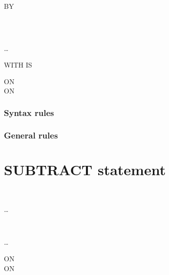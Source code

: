\begin{syntax}
  \begin{1=}
    \begin{1=}
      \identifier \\
      \literal
    \end{1=}

    \begin{0-1}
       BY
      \begin{1=}
         \\
        \identifier \\
        \literal
      \end{1=}
    \end{0-1}
  \end{1=} \ldots\ {}
   \identifier

  \begin{0-1}
    WITH  IS \identifier
  \end{0-1}

  \begin{0+}
    ON  \imperativestatement \\
     ON  \imperativestatement
  \end{0+}
\end{syntax}

\subsubsection{Syntax rules}

\subsubsection{General rules}

\section{SUBTRACT statement}

\begin{syntax}
  \begin{1=}
    \identifier \\
    \literal
  \end{1=} \ldots
  \begin{1=}
    \begin{1=}
      \identifier \\
      \literal
    \end{1=}
    \begin{0-1}
    \end{0-1}
  \end{1=} \ldots

  \begin{0+}
    ON   \imperativestatement \\
     ON   \imperativestatement
  \end{0+}

  \begin{0-1}
  \end{0-1}
\end{syntax}

